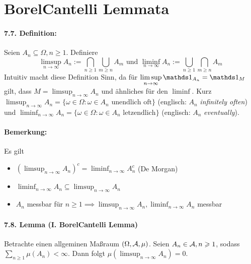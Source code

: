 \documentclass[12pt]{report}
\begin{document}
\section*{Borel\textendash Cantelli Lemmata}

\paragraph{7.7. Definition:}Seien $A_n\subseteq\Omega, n\geq1$. Definiere
$$\limsup_{n\to\infty}A_n:=\bigcap_{n\geq1}\bigcup_{m\geq n}A_m\text{ und }\liminf_{n\to\infty}A_n:=\bigcup_{n\geq1}\bigcap_{m\geq n}A_m$$
Intuitiv macht diese Definition Sinn, da f\"ur $\displaystyle\limsup_{n\to\infty}\ind{A_n}=\ind{M}$ gilt, dass $M=\displaystyle\limsup_{n\to\infty}A_n$ und \"ahnliches f\"ur den $\liminf$. Kurz $\displaystyle\limsup_{n\to\infty}A_n=\{\omega\in\Omega:\omega\in A_n\text{ unendlich oft}\}$ (englisch: $A_n$ \textit{infinitely often}) und $\displaystyle\liminf_{n\to\infty}A_n=\{\omega\in\Omega:\omega\in A_n \text{ letzendlich}\}$ (englisch: $A_n$ \textit{eventually}). 

\paragraph{Bemerkung:}Es gilt
\begin{itemize}
    \item $\displaystyle\left(\limsup_{n\to\infty}A_n\right)^c=\liminf_{n\to\infty}A_n^c$ (De Morgan)
    \item $\displaystyle\liminf_{n\to\infty}A_n\subseteq\limsup_{n\to\infty}A_n$
    \item $A_n$ messbar f\"ur $n\geq1\implies\displaystyle\limsup_{n\to\infty}A_n,\liminf_{n\to\infty}A_n$ messbar
\end{itemize}

\paragraph{7.8. Lemma (I. Borel\textendash Cantelli Lemma)}Betrachte einen allgeminen Ma\ss{}raum $(\Omega,\mathcal{A},\mu)$. Seien $A_n\in\mathcal{A},n\geqslant1$, sodass $\displaystyle\sum_{n\geq1}\mu(A_n)<\infty$. Dann folgt $\mu\left(\displaystyle\limsup_{n\to\infty}A_n\right)=0$.
\end{document}
